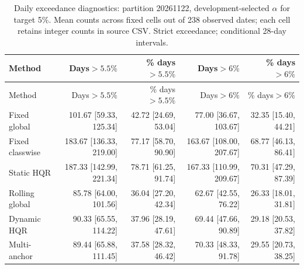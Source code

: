 \begingroup\small\setlength{\tabcolsep}{3pt}
\begin{longtable}{lrrrr}
\caption{Daily exceedance diagnostics: partition 20261122, development-selected $\alpha$ for target 5\%. Mean counts across fixed cells out of 238 observed dates; each cell retains integer counts in source CSV. Strict exceedance; conditional 28-day intervals.}\label{tab:final-risk-1-1-exceed}\\
\toprule
Method & Days$>5.5\%$ & \% days$>5.5\%$ & Days$>6\%$ & \% days$>6\%$\\
\midrule
\endfirsthead
\toprule
Method & Days$>5.5\%$ & \% days$>5.5\%$ & Days$>6\%$ & \% days$>6\%$\\
\midrule
\endhead
Fixed global & 101.67 [59.33, 125.34] & 42.72 [24.69, 53.04] & 77.00 [36.67, 103.67] & 32.35 [15.40, 44.21]\\
Fixed classwise & 183.67 [136.33, 219.00] & 77.17 [58.70, 90.90] & 163.67 [108.00, 207.67] & 68.77 [46.13, 86.41]\\
Static HQR & 187.33 [142.99, 221.34] & 78.71 [61.25, 91.74] & 167.33 [110.99, 209.67] & 70.31 [47.29, 87.39]\\
Rolling global & 85.78 [64.00, 101.56] & 36.04 [27.20, 42.34] & 62.67 [42.55, 76.22] & 26.33 [18.01, 31.81]\\
Dynamic HQR & 90.33 [65.55, 114.22] & 37.96 [28.19, 47.61] & 69.44 [47.66, 90.89] & 29.18 [20.53, 37.82]\\
Multi-anchor & 89.44 [65.88, 111.45] & 37.58 [28.32, 46.42] & 70.33 [48.33, 91.78] & 29.55 [20.73, 38.25]\\
\bottomrule
\end{longtable}
\endgroup
